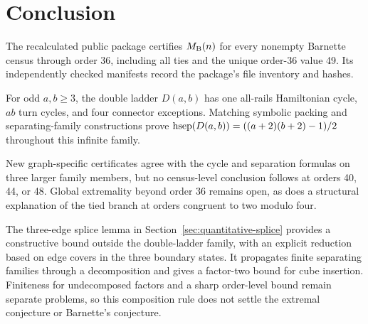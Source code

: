 \section{Conclusion}
\label{sec:conclusion}

The recalculated public package certifies \(M_{\mathrm B}(n)\) for every nonempty Barnette
census through order 36, including all ties and the unique order-36 value 49.
Its independently checked manifests record the package's file inventory and
hashes.

For odd \(a,b\ge3\), the double ladder \(D(a,b)\) has one all-rails
Hamiltonian cycle, \(ab\) turn cycles, and four connector exceptions.  Matching
symbolic packing and separating-family constructions prove
\(\operatorname{hsep}(D(a,b))=((a+2)(b+2)-1)/2\) throughout this infinite family.

New graph-specific certificates agree with the cycle and separation formulas on
three larger family members, but no census-level conclusion follows at orders
40, 44, or 48.  Global extremality beyond order 36 remains open, as does a
structural explanation of the tied branch at orders congruent to two modulo
four.


The three-edge splice lemma in Section~\ref{sec:quantitative-splice} provides
a constructive bound outside the double-ladder family, with an explicit
reduction based on edge covers in the three boundary states. It propagates
finite separating families through a decomposition and gives a factor-two
bound for cube insertion. Finiteness for undecomposed factors and a sharp
order-level bound remain separate problems, so this composition rule does
not settle the extremal conjecture or Barnette's conjecture.
